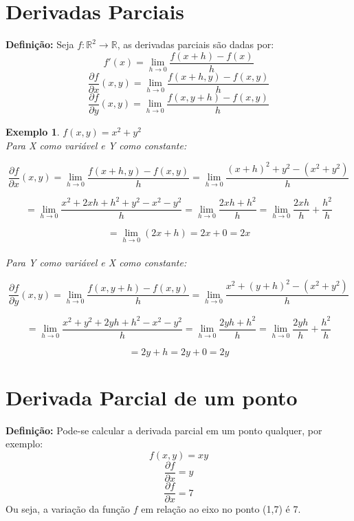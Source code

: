 \documentclass{book}
\numberwithin{defn}{chapter}
\newtheorem{exe}{Exemplo}
\numberwithin{exe}{chapter}
\numberwithin{ex}{chapter}
\numberwithin{obs}{chapter}
\numberwithin{fato}{chapter}
\numberwithin{resp}{chapter}
\begin{document}
\section{Derivadas Parciais} %

\textbf{Definição:} Seja \(f: \mathbb{R}^2 \rightarrow \mathbb{R}\), as derivadas parciais são dadas por: 
\[f'(x) = \lim_{h \to 0} \frac{f(x+h) - f(x)}{h}\]
\[\frac{\partial f}{\partial x}(x, y) = \lim_{h \to 0} \frac{f(x+h, y) - f(x,y)}{h}\]
\[\frac{\partial f}{\partial y}(x, y) = \lim_{h \to 0} \frac{f(x, y+h) - f(x,y)}{h}\]

\begin{exe} \(f(x, y) =x^2 + y^2\)\\

Para X como variável e Y como constante:

\[\frac{\partial f}{\partial x}(x, y) = \lim_{h \to 0} \frac{f(x+h, y) - f(x, y)}{h} = \lim_{h \to 0} \frac{(x + h)^2 + y^2 - (x^2 + y^2)}{h}\]

\[= \lim_{h \to 0} \frac{x^2 + 2xh + h^2 + y^2 - x^2 - y^2}{h} = \lim_{h \to 0} \frac{2xh + h^2}{h} = \lim_{h \to 0} \frac{2xh}{h} + \frac{h^2}{h}\]

\[= \lim_{h \to 0} (2x + h) = 2x + 0 = 2x\]\\

Para Y como variável e X como constante:

\[\frac{\partial f}{\partial y}(x, y) = \lim_{h \to 0} \frac{f(x, y+h) - f(x, y)}{h} = \lim_{h \to 0} \frac{x^2 + (y + h)^2 - (x^2 + y^2)}{h}\]

\[= \lim_{h \to 0} \frac{x^2 + y^2 + 2yh + h^2 - x^2 - y^2}{h} = \lim_{h \to 0} \frac{2yh + h^2}{h} = \lim_{h \to 0} \frac{2yh}{h} + \frac{h^2}{h}
\]

\[= 2y + h = 2y + 0 = 2y\]

\end{exe}

\section{Derivada Parcial de um ponto} 
\textbf{Definição:} Pode-se calcular a derivada parcial em um ponto qualquer, por exemplo:
\[f(x, y) = xy\]
\[\frac{\partial f}{\partial x} = y\]
\[\frac{\partial f}{\partial x} = 7\]
Ou seja, a variação da função \(f\) em relação ao eixo no ponto (1,7) é 7.
\end{document}
